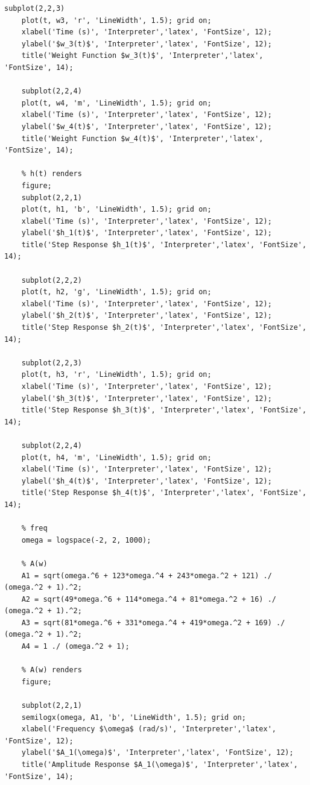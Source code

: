 \documentclass[a4paper, 12pt]{article}
\begin{document}
\begin{lstlisting}[label=task1, caption={Программа для задания 1}]
    subplot(2,2,3)
    plot(t, w3, 'r', 'LineWidth', 1.5); grid on;
    xlabel('Time (s)', 'Interpreter','latex', 'FontSize', 12);
    ylabel('$w_3(t)$', 'Interpreter','latex', 'FontSize', 12);
    title('Weight Function $w_3(t)$', 'Interpreter','latex', 'FontSize', 14);

    subplot(2,2,4)
    plot(t, w4, 'm', 'LineWidth', 1.5); grid on;
    xlabel('Time (s)', 'Interpreter','latex', 'FontSize', 12);
    ylabel('$w_4(t)$', 'Interpreter','latex', 'FontSize', 12);
    title('Weight Function $w_4(t)$', 'Interpreter','latex', 'FontSize', 14);

    % h(t) renders
    figure;
    subplot(2,2,1)
    plot(t, h1, 'b', 'LineWidth', 1.5); grid on;
    xlabel('Time (s)', 'Interpreter','latex', 'FontSize', 12);
    ylabel('$h_1(t)$', 'Interpreter','latex', 'FontSize', 12);
    title('Step Response $h_1(t)$', 'Interpreter','latex', 'FontSize', 14);

    subplot(2,2,2)
    plot(t, h2, 'g', 'LineWidth', 1.5); grid on;
    xlabel('Time (s)', 'Interpreter','latex', 'FontSize', 12);
    ylabel('$h_2(t)$', 'Interpreter','latex', 'FontSize', 12);
    title('Step Response $h_2(t)$', 'Interpreter','latex', 'FontSize', 14);

    subplot(2,2,3)
    plot(t, h3, 'r', 'LineWidth', 1.5); grid on;
    xlabel('Time (s)', 'Interpreter','latex', 'FontSize', 12);
    ylabel('$h_3(t)$', 'Interpreter','latex', 'FontSize', 12);
    title('Step Response $h_3(t)$', 'Interpreter','latex', 'FontSize', 14);

    subplot(2,2,4)
    plot(t, h4, 'm', 'LineWidth', 1.5); grid on;
    xlabel('Time (s)', 'Interpreter','latex', 'FontSize', 12);
    ylabel('$h_4(t)$', 'Interpreter','latex', 'FontSize', 12);
    title('Step Response $h_4(t)$', 'Interpreter','latex', 'FontSize', 14);

    % freq
    omega = logspace(-2, 2, 1000);

    % A(w)
    A1 = sqrt(omega.^6 + 123*omega.^4 + 243*omega.^2 + 121) ./ (omega.^2 + 1).^2;
    A2 = sqrt(49*omega.^6 + 114*omega.^4 + 81*omega.^2 + 16) ./ (omega.^2 + 1).^2;
    A3 = sqrt(81*omega.^6 + 331*omega.^4 + 419*omega.^2 + 169) ./ (omega.^2 + 1).^2;
    A4 = 1 ./ (omega.^2 + 1);

    % A(w) renders
    figure;

    subplot(2,2,1)
    semilogx(omega, A1, 'b', 'LineWidth', 1.5); grid on;
    xlabel('Frequency $\omega$ (rad/s)', 'Interpreter','latex', 'FontSize', 12);
    ylabel('$A_1(\omega)$', 'Interpreter','latex', 'FontSize', 12);
    title('Amplitude Response $A_1(\omega)$', 'Interpreter','latex', 'FontSize', 14);


\end{lstlisting}
\end{document}
